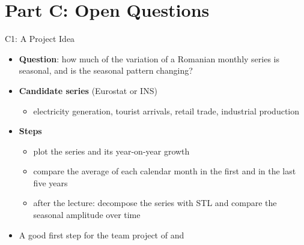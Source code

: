 \section{Part C: Open Questions}

\begin{frame}{C1: A Project Idea}
\itemsize{\small}
\begin{itemize}
    \item \textbf{Question}: how much of the variation of a Romanian monthly series is seasonal, and is the seasonal pattern changing?
    \item \textbf{Candidate series} (Eurostat or INS)
    \begin{itemize}
        \item electricity generation, tourist arrivals, retail trade, industrial production
    \end{itemize}
    \item \textbf{Steps}
    \begin{itemize}
        \item plot the series and its year-on-year growth
        \item compare the average of each calendar month in the first and in the last five years
        \item after the lecture: decompose the series with STL and compare the seasonal amplitude over time
    \end{itemize}
    \item A good first step for the team project of  and 
\end{itemize}
\end{frame}

